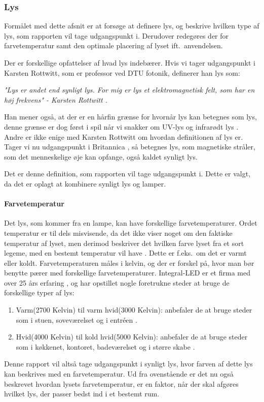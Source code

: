 \subsubsection{Lys}
\label{sec:lys}
Formålet med dette afsnit er at forsøge at definere lys, og beskrive hvilken type af lys, som rapporten vil tage udgangspunkt i. Derudover redegøres der for farvetemperatur samt den optimale placering af lyset ift.\ anvendelsen.


Der er forskellige opfattelser af hvad lys indebærer. Hvis vi tager udgangspunkt i Karsten Rottwitt, som er professor ved DTU fotonik, definerer han lys som:


\textit{"Lys er andet end synligt lys. For mig er lys et elektromagnetisk felt, som har en høj frekvens"
- Karsten Rottwitt \cite{def_lys}.}

Han mener også, at der er en hårfin grænse for hvornår lys kan betegnes som lys, denne grænse er dog først i spil når vi snakker om UV-lys og infrarødt lys \cite{def_lys}. 
Andre er ikke enige med Karsten Rottwitt om hvordan definitionen af lys er. Tager vi nu udgangspunkt i Britannica \cite{britannica_lys}, så betegnes lys, som magnetiske stråler, som det menneskelige øje kan opfange, også kaldet synligt lys. 


Det er denne definition, som rapporten vil tage udgangspunkt i. Dette er valgt, da det er oplagt at kombinere synligt lys og lamper.

\paragraph{Farvetemperatur}
Det lys, som kommer fra en lampe, kan have forskellige farvetemperaturer. Ordet temperatur er til dels misvisende, da det ikke viser noget om den faktiske temperatur af lyset, men derimod beskriver det hvilken farve lyset fra et sort legeme, med en bestemt temperatur vil have \cite{farvetemp}. Dette er f.eks.\ om det er varmt eller koldt. Farvetemperaturen måles i kelvin, og der er forskel på, hvor man bør benytte pærer med forskellige farvetemperaturer. Integral-LED er et firma med over 25 års erfaring \cite{integral_led}, og har opstillet nogle foretrukne steder at bruge de forskellige typer af lys:

\begin{enumerate}
\item Varm(2700 Kelvin) til varm hvid(3000 Kelvin): anbefaler de at bruge steder som i stuen, soveværelset og i entréen \cite{varm_kold}.
\item Hvid(4000 Kelvin) til kold hvid(5000 Kelvin): anbefaler de at bruge steder som i køkkenet, kontoret, badeværelset og i større skabe \cite{varm_kold}.
\end{enumerate}

Denne rapport vil altså tage udgangspunkt i synligt lys, hvor farven af dette lys kan beskrives med en farvetemperatur. Ud fra ovenstående er det nu også beskrevet hvordan lysets farvetemperatur, er en faktor, når der skal afgøres hvilket lys, der passer bedst ind i et bestemt rum.
